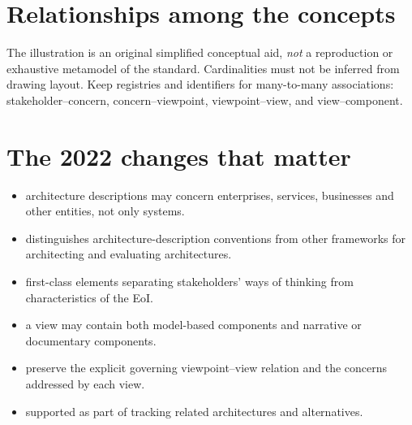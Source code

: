 \documentclass[11pt,letterpaper]{article}
\begin{document}
\section{Relationships among the concepts}
\begin{center}
\end{center}
\begin{Guidance}The illustration is an original simplified conceptual aid, \emph{not} a reproduction or exhaustive metamodel of the standard. Cardinalities must not be inferred from drawing layout. Keep registries and identifiers for many-to-many associations: stakeholder--concern, concern--viewpoint, viewpoint--view, and view--component.\end{Guidance}
\section{The 2022 changes that matter}
\begin{itemize}
\item {} architecture descriptions may concern enterprises, services, businesses and other entities, not only systems.
\item {} distinguishes architecture-description conventions from other frameworks for architecting and evaluating architectures.
\item {} first-class elements separating stakeholders' ways of thinking from characteristics of the EoI.
\item {} a view may contain both model-based components and narrative or documentary components.
\item {} preserve the explicit governing viewpoint--view relation and the concerns addressed by each view.
\item {} supported as part of tracking related architectures and alternatives.
\end{itemize}
\end{document}
